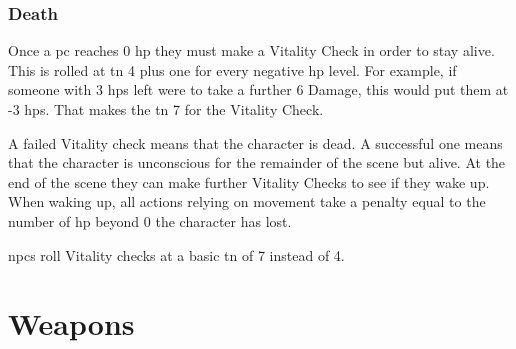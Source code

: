 \begin{multicols}{2}
\subsubsection{Death}
Once a \gls{pc} reaches 0 \gls{hp} they must make a 
Vitality Check in order to stay alive.
This is rolled at \gls{tn} 4 plus one for every negative \gls{hp} level.\iftoggle{verbose}{\footnote{Traits such as Strength do not affect the Vitality check because in a way, they already have.
Stronger characters already have more \gls{hp}, which has already kept them farther from death.}}{}
For example, if someone with 3 \glspl{hp} left were to take a further 6 Damage, this would put them at -3 \glspl{hp}.
That makes the \gls{tn} 7 for the Vitality Check.

A failed Vitality check means that the character is dead.%
\iftoggle{verbose}{%
\footnote{See page \pageref{pcdeath} on what to do once a \gls{pc} dies.}%
}{%
	The player must roll up a new character with either 50 \glspl{xp} or half the total \glspl{xp} of whichever party member has the most \glspl{xp}.
}%
A successful one means that the character is unconscious for the remainder of the scene but alive.
At the end of the scene they can make further Vitality Checks to see if they wake up.
When waking up, all actions relying on movement take a penalty equal to the number of \gls{hp} beyond 0 the character has lost.

\glspl{npc} roll Vitality checks at a basic \gls{tn} of 7 instead of 4.

\end{multicols}

\section{Weapons}


